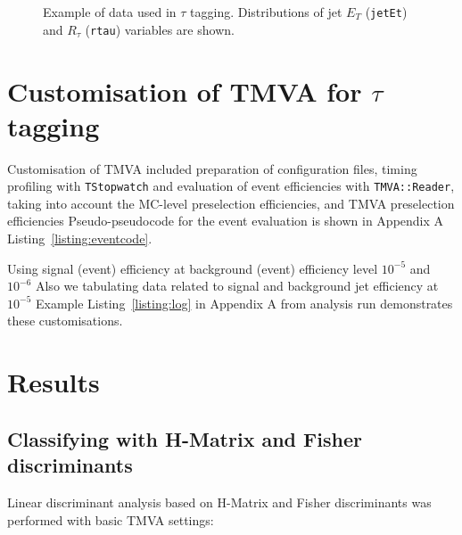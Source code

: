 \documentclass[a4paper]{jpconf}
\begin{document}
\begin{figure}[h]
\caption{Example of data used in $\tau$ tagging.
Distributions of jet $E_T$ ({\tt jetEt}) and $R_{\tau}$ ({\tt rtau}) variables are shown.}
\label{fig:variables}
\end{figure}


 

\section{Customisation of TMVA for $\tau$ tagging}

Customisation of TMVA included preparation of
configuration files, timing profiling with {\tt TStopwatch}
and evaluation of event efficiencies with {\tt TMVA::Reader}, taking into account
   the MC-level preselection efficiencies, and TMVA preselection efficiencies
Pseudo-pseudocode for the event evaluation is shown in  Appendix A Listing~\ref{listing:eventcode}.

Using signal (event) efficiency at background (event) efficiency level $10^{-5}$ and $10^{-6}$
Also we tabulating data related to  signal and background jet efficiency at $10^{-5}$
Example Listing~\ref{listing:log} in Appendix A from analysis run demonstrates these customisations.


\section{Results}

\subsection{Classifying with H-Matrix and Fisher discriminants}
Linear discriminant analysis  based on H-Matrix and Fisher discriminants
was performed with basic TMVA settings:
\end{document}
